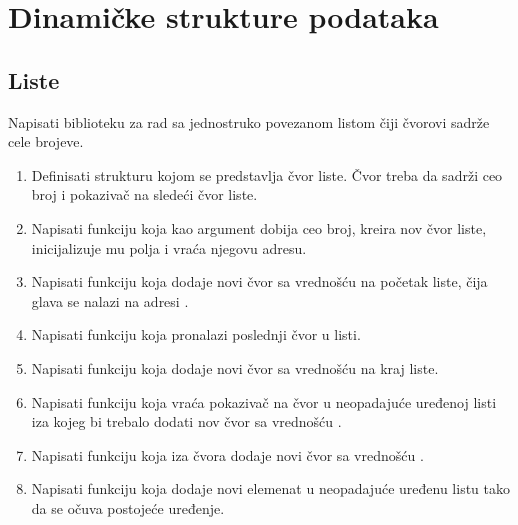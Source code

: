 \chapter{Dinamičke strukture podataka}

\section{Liste}

\begin{Exercise}[label=4_01]
Napisati biblioteku za rad sa jednostruko povezanom listom čiji čvorovi sadrže cele brojeve. 
\begin{enumerate}
\item Definisati strukturu  kojom se predstavlja čvor liste. Čvor treba da sadrži ceo broj  i pokazivač na sledeći čvor liste.

\item Napisati funkciju  koja kao argument dobija ceo broj, kreira nov čvor liste, inicijalizuje mu polja i vraća njegovu adresu.

 \item Napisati funkciju  koja dodaje novi čvor sa vrednošću  na početak liste, čija glava se nalazi na adresi .

 \item Napisati funkciju  koja pronalazi poslednji čvor u listi.

 \item Napisati funkciju  koja dodaje novi čvor sa vrednošću  na kraj liste.

 \item Napisati funkciju  koja vraća pokazivač na čvor u neopadajuće uređenoj listi iza kojeg bi trebalo dodati nov čvor sa vrednošću .

 \item Napisati funkciju  koja iza čvora  dodaje novi čvor sa vrednošću .

 \item Napisati funkciju  koja dodaje novi elemenat u neopadajuće uređenu listu tako da se očuva postojeće uređenje.


\end{enumerate}
\end{Exercise}
